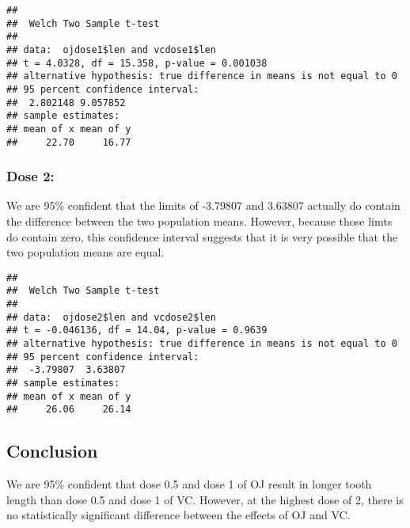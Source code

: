 \documentclass[]{article}
\newenvironment{Shaded}{\begin{snugshade}}{\end{snugshade}}
\newcommand{\KeywordTok}[1]{\textcolor[rgb]{0.13,0.29,0.53}{\textbf{{#1}}}}
\newcommand{\StringTok}[1]{\textcolor[rgb]{0.31,0.60,0.02}{{#1}}}
\newcommand{\NormalTok}[1]{{#1}}
\begin{document}
\begin{verbatim}
## 
##  Welch Two Sample t-test
## 
## data:  ojdose1$len and vcdose1$len
## t = 4.0328, df = 15.358, p-value = 0.001038
## alternative hypothesis: true difference in means is not equal to 0
## 95 percent confidence interval:
##  2.802148 9.057852
## sample estimates:
## mean of x mean of y 
##     22.70     16.77
\end{verbatim}

\subsubsection{Dose 2:}\label{dose-2}

We are 95\% confident that the limits of -3.79807 and 3.63807 actually
do contain the difference between the two population means. However,
because those limts do contain zero, this confidence interval suggests
that it is very possible that the two population means are equal.

\begin{Shaded}
\end{Shaded}

\begin{verbatim}
## 
##  Welch Two Sample t-test
## 
## data:  ojdose2$len and vcdose2$len
## t = -0.046136, df = 14.04, p-value = 0.9639
## alternative hypothesis: true difference in means is not equal to 0
## 95 percent confidence interval:
##  -3.79807  3.63807
## sample estimates:
## mean of x mean of y 
##     26.06     26.14
\end{verbatim}

\subsection{Conclusion}\label{conclusion}

We are 95\% confident that dose 0.5 and dose 1 of OJ result in longer
tooth length than dose 0.5 and dose 1 of VC. However, at the highest
dose of 2, there is no statistically significant difference between the
effects of OJ and VC.
\end{document}
